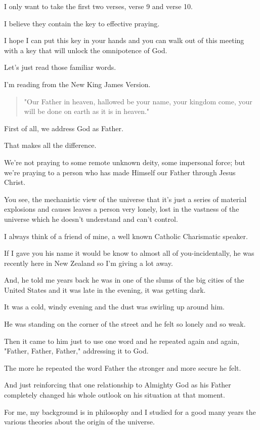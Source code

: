\documentclass[11pt]{article}
\begin{document}
I only want to take the first two verses,
verse 9 and verse 10.

I believe they contain the key to effective
praying.

I hope I can put this key in your hands and
you can walk out of this meeting with a key
that will unlock the omnipotence of God.

Let's just read those familiar words.

I'm reading from the New King James Version.

\begin{quote}
"Our Father in heaven, hallowed be your name,
your kingdom come, your will be done on earth
as it is in heaven."
\end{quote}

First of all, we address God as Father.

That makes all the difference.

We're not praying to some remote unknown
deity, some impersonal force; but we're
praying to a person who has made Himself our
Father through Jesus Christ.

You see, the mechanistic view of the universe
that it's just a series of material explosions
and causes leaves a person very lonely, lost
in the vastness of the universe which he
doesn't understand and can't control.

I always think of a friend of mine, a well
known Catholic Charismatic speaker.

If I gave you his name it would be know to
almost all of you-incidentally, he was
recently here in New Zealand so I'm giving a
lot away.

And, he told me years back he was in one of
the slums of the big cities of the United
States and it was late in the evening, it was
getting dark.

It was a cold, windy evening and the dust was
swirling up around him.

He was standing on the corner of the street
and he felt so lonely and so weak.

Then it came to him just to use one word and
he repeated again and again, "Father, Father,
Father," addressing it to God.

The more he repeated the word Father the
stronger and more secure he felt.

And just reinforcing that one relationship to
Almighty God as his Father completely changed
his whole outlook on his situation at that
moment.

For me, my background is in philosophy and I
studied for a good many years the various
theories about the origin of the universe.
\end{document}
